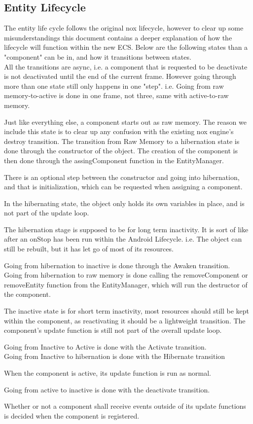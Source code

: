 \subsection{Entity Lifecycle}
The entity life cycle follows the original nox lifecycle,
however to clear up some misunderstandings this document contains a deeper explanation of how the lifecycle will function within the new ECS.
Below are the following states than a "component" can be in, and how it transitions between states.\\
All the transitions are async, i.e. a component that is requested to be deactivate is not deactivated until the end of the current frame.
However going through more than one state still only happens in one "step".
i.e. Going from raw memory-to-active is done in one frame, not three, same with active-to-raw memory.

Just like everything else, a component starts out as raw memory. 
The reason we include this state is to clear up any confusion with the existing nox engine's destroy transition. 
The transition from Raw Memory to a hibernation state is done through the constructor of the object. The creation of the component is then done through the assingComponent function in the EntityManager.

There is an optional step between the constructor and going into hibernation, and that is initialization, which can be requested when assigning a component.

In the hibernating state, the object only holds its own variables in place, and is not part of the update loop.

The hibernation stage is supposed to be for long term inactivity.
It is sort of like after an onStop has been run within the Android Lifecycle. i.e. The object can still be rebuilt, but it has let go of most of its resources.

Going from hibernation to inactive is done through the Awaken transition.\\
Going from hibernation to raw memory is done calling the removeComponent or removeEntity function from the EntityManager, 
which will run the destructor of the component.

The inactive state is for short term inactivity, most resources should still be kept within the component, 
as reactivating it should be a lightweight transition.
The component's update function is still not part of the overall update loop.

Going from Inactive to Active is done with the Activate transition.\\
Going from Inactive to hibernation is done with the Hibernate transition

When the component is active, its update function is run as normal.

Going from active to inactive is done with the deactivate transition.

Whether or not a component shall receive events outside of its update functions is decided when the component is registered.
